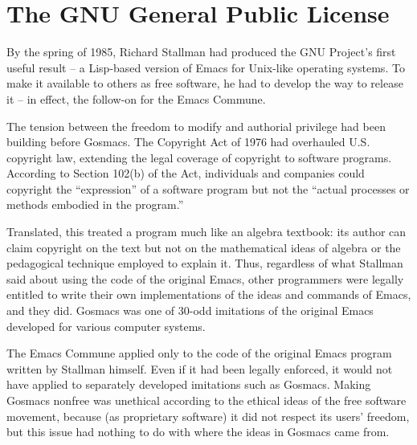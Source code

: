 

\chapter{The GNU General Public License}

By the spring of 1985, Richard Stallman had produced the GNU Project's first useful result -- a Lisp-based version of Emacs for Unix-like operating systems. To make it available to others as free software, he had to develop the way to release it -- in effect, the follow-on for the Emacs Commune.

The tension between the freedom to modify and authorial privilege had been building before Gosmacs. The Copyright Act of 1976 had overhauled U.S. copyright law, extending the legal coverage of copyright to software programs. According to Section 102(b) of the Act, individuals and companies could copyright the ``expression'' of a software program but not the ``actual processes or methods embodied in the program.''

Translated, this treated a program much like an algebra textbook: its author can claim copyright on the text but not on the mathematical ideas of algebra or the pedagogical technique employed to explain it.  Thus, regardless of what Stallman said about using the code of the original Emacs, other programmers were legally entitled to write their own implementations of the ideas and commands of Emacs, and they did.  Gosmacs was one of 30-odd imitations of the original Emacs developed for various computer systems.

The Emacs Commune applied only to the code of the original Emacs program written by Stallman himself.  Even if it had been legally enforced, it would not have applied to separately developed imitations such as Gosmacs.  Making Gosmacs nonfree was unethical according to the ethical ideas of the free software movement, because (as proprietary software) it did not respect its users' freedom, but this issue had nothing to do with where the ideas in Gosmacs came from.

